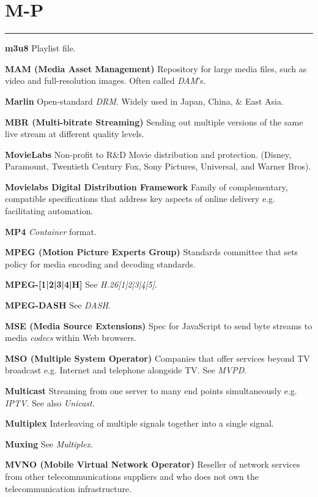\section{M-P}
\hrule

\medskip
\textbf{m3u8}
Playlist file.

\smallskip
\textbf{MAM (Media Asset Management)}
Repository for large media files, such as video and full-resolution images. Often called \textit{DAM}'s.

\smallskip
\textbf{Marlin}
Open-standard \textit{DRM}. Widely used in Japan, China, \& East Asia.

\smallskip
\textbf{MBR (Multi-bitrate Streaming)}
Sending out multiple versions of the same live stream at different quality levels.

\smallskip
\textbf{MovieLabs}
Non-profit to R\&D Movie distribution and protection. (Disney, Paramount, Twentieth Century Fox, Sony Pictures, Universal, and Warner Bros).

\smallskip
\textbf{Movielabs Digital Distribution Framework}
Family of complementary, compatible specifications that address key aspects of online delivery e.g. facilitating automation.

\smallskip
\textbf{MP4}
\textit{Container} format.

\smallskip
\textbf{MPEG (Motion Picture Experts Group)}
Standards committee that sets policy for media encoding and decoding standards.

\smallskip
\textbf{MPEG-[1|2|3|4|H]}
See \textit{H.26[1|2|3|4|5]}.

\smallskip
\textbf{MPEG-DASH}
See \textit{DASH}.

\smallskip
\textbf{MSE (Media Source Extensions)}
Spec for JavaScript to send byte streams to media \textit{codecs} within Web browsers.

\smallskip
\textbf{MSO (Multiple System Operator)}
Companies that offer services beyond TV broadcast e.g. Internet and telephone alongside TV.  See \textit{MVPD}.

\smallskip
\textbf{Multicast}
Streaming from one server to many end points simultaneously e.g. \textit{IPTV}.  See also \textit{Unicast}.

\smallskip
\textbf{Multiplex}
Interleaving of multiple signals together into a single signal.

\smallskip
\textbf{Muxing}
See \textit{Multiplex}.

\smallskip
\textbf{MVNO (Mobile Virtual Network Operator)}
Reseller of network services from other telecommunications suppliers and who does not own the telecommunication infrastructure.

